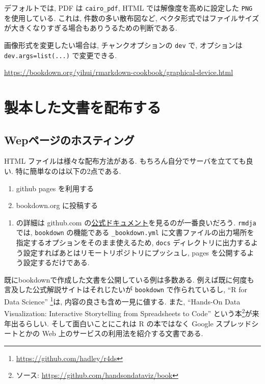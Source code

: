 \documentclass[
  xelatex,ja=standard,jafont=noto]{bxjsbook}
\providecommand{\tightlist}{%
  \setlength{\itemsep}{0pt}\setlength{\parskip}{0pt}}
\theoremstyle{definition}
\theoremstyle{definition}
\theoremstyle{definition}
\theoremstyle{definition}
\theoremstyle{remark}
\begin{document}
デフォルトでは, PDF は \texttt{cairo\_pdf}, HTML
では解像度を高めに設定した \texttt{PNG} を使用している. これは,
件数の多い散布図など,
ベクタ形式ではファイルサイズが大きくなりすぎる場合もありうるための判断である.

画像形式を変更したい場合は, チャンクオプションの \texttt{dev} で,
オプションは \texttt{dev.args=list(...)} で変更できる.

\url{https://bookdown.org/yihui/rmarkdown-cookbook/graphical-device.html}

\hypertarget{ux88fdux672cux3057ux305fux6587ux66f8ux3092ux914dux5e03ux3059ux308b}{%
\chapter{製本した文書を配布する}\label{ux88fdux672cux3057ux305fux6587ux66f8ux3092ux914dux5e03ux3059ux308b}}

\hypertarget{wepux30daux30fcux30b8ux306eux30dbux30b9ux30c6ux30a3ux30f3ux30b0}{%
\section{Wepページのホスティング}\label{wepux30daux30fcux30b8ux306eux30dbux30b9ux30c6ux30a3ux30f3ux30b0}}

HTML ファイルは様々な配布方法がある. もちろん自分でサーバを立てても良い.
特に簡単なのは以下の2点である.

\begin{enumerate}
\def\labelenumi{\arabic{enumi}.}
\tightlist
\item
  github pages を利用する
\item
  bookdown.org に投稿する
\end{enumerate}

\begin{enumerate}
\def\labelenumi{(\arabic{enumi})}
\tightlist
\item
  の詳細は github.com
  の\href{https://docs.github.com/ja/github/working-with-github-pages/about-github-pages}{公式ドキュメント}を見るのが一番良いだろう.
  \texttt{rmdja} では, \texttt{bookdown} の機能である
  \texttt{\_bookdown.yml}
  に文書ファイルの出力場所を指定するオプションをそのまま使えるため,
  \texttt{docs}
  ディレクトリに出力するよう設定すればあとはリモートリポジトリにプッシュし,
  pages を公開するよう設定するだけである.
\end{enumerate}

既にbookdownで作成した文書を公開している例は多数ある.
例えば既に何度も言及した公式解説サイトはそれじたいが \texttt{bookdown}
で作られているし, ``R for Data Science'' \citep{wickham2016Data}
\footnote{\url{https://github.com/hadley/r4ds}}は,
内容の良さも含め一見に値する. また, ``Hands-On Data Visualization:
Interactive Storytelling from Spreadsheets to Code''
\citep{doughertyforthcomingHandsOn} という本\footnote{ソース:
  \url{https://github.com/handsondataviz/book}}が来年出るらしい.
そして面白いことにこれは R の本ではなく Google スプレッドシートとかの
Web 上のサービスの利用法を紹介する文書である.
\end{document}
